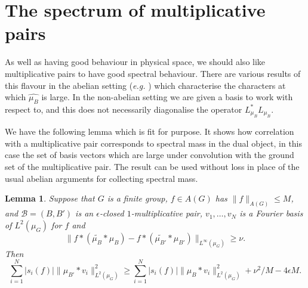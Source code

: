\documentclass[12pt]{amsart}
\numberwithin{equation}{section}
\theoremstyle{plain}
\newtheorem{lemma}[subsection]{Lemma}
\theoremstyle{definition}
\renewcommand{\leq}{\leqslant}
\renewcommand{\geq}{\geqslant}
\newcommand{\wh}{\widehat}
\begin{document}
\section{The spectrum of multiplicative pairs}\label{sec.specmp}

As well as having good behaviour in physical space, we should also like multiplicative pairs to have good spectral behaviour.  There are various results of this flavour in the abelian setting (\emph{e.g.} \cite[Lemma 3.6]{BJGSVK}) which characterise the characters at which $\wh{\mu_B}$ is large.  In the non-abelian setting we are given a basis to work with respect to, and this does not necessarily diagonalise the operator $L_{\mu_B}^*L_{\mu_B}$.

We have the following lemma which is fit for purpose.  It shows how correlation with a multiplicative pair corresponds to spectral mass in the dual object, in this case the set of basis vectors which are large under convolution with the ground set of the multiplicative pair.  The result can be used without loss in place of the usual abelian arguments for collecting spectral mass.
\begin{lemma}\label{lem.spectralcollection}
Suppose that $G$ is a finite group, $f \in A(G)$ has $\|f\|_{A(G)} \leq M$, and $\mathcal{B}=(B,B')$ is an $\epsilon$-closed $1$-multiplicative pair, $v_1,\dots,v_N$ is a Fourier basis of $L^2(\mu_G)$ for $f$ and 
\begin{equation*}
\|f \ast(\widetilde{\mu_B}\ast \mu_B) - f \ast (\widetilde{\mu_{B'}}\ast \mu_{B'}) \|_{L^\infty(\mu_G)} \geq \nu.
\end{equation*}
Then
\begin{equation*}
\sum_{i=1}^N{|s_i(f)|\|\mu_{B'} \ast v_i\|_{L^2(\mu_G)}^2} \geq \sum_{i=1}^N{|s_i(f)|\|\mu_{B} \ast v_i\|_{L^2(\mu_G)}^2} +\nu^2/M-4\epsilon M.
\end{equation*}
\end{lemma}
\end{document}
